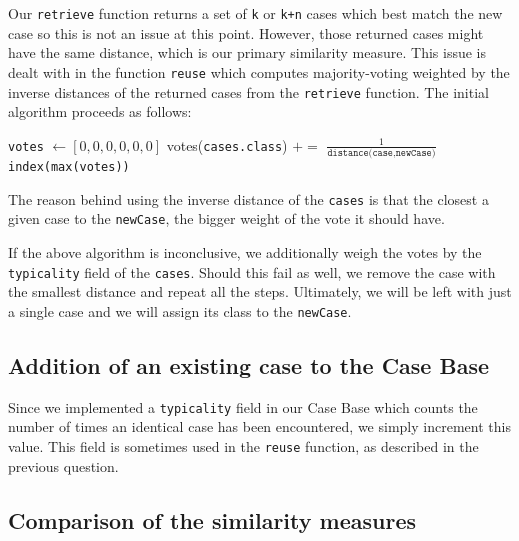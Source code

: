 \documentclass[a4paper]{article}
\begin{document}
Our \texttt{retrieve} function returns a set of \texttt{k} or \texttt{k+n} cases which best match the new case so this is not an issue at this point. However, those returned cases might have the same distance, which is our primary similarity measure. This issue is dealt with in the function \texttt{reuse} which computes majority-voting weighted by the inverse distances of the returned cases from the \texttt{retrieve} function. The initial algorithm proceeds as follows: \medskip
\begin{algorithmic}
\State \texttt{votes} $\gets [0,0,0,0,0,0]$
     	\State votes(\texttt{cases.class}) $+=$ $\frac{1}{\texttt{distance(case,newCase})}$
     \EndFor \\
\Return \texttt{index(max(votes))} 
\end{algorithmic} \medskip
The reason behind using the inverse distance of the \texttt{cases} is that the closest a given case to the \texttt{newCase}, the bigger weight of the vote it should have.\medskip

If the above algorithm is inconclusive, we additionally weigh the votes by the \texttt{typicality} field of the \texttt{cases}. Should this fail as well, we remove the case with the smallest distance and repeat all the steps. Ultimately, we will be left with just a single case and we will assign its class to the \texttt{newCase}.

\subsection{Addition of an existing case to the Case Base}

Since we implemented a \texttt{typicality} field in our Case Base which counts the number of times an identical case has been encountered, we simply increment this value. This field is sometimes used in the \texttt{reuse} function, as described in the previous question.

\subsection{Comparison of the similarity measures}
\end{document}
